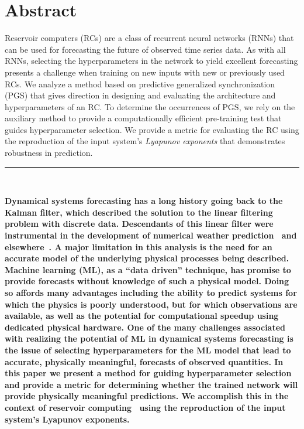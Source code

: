 \documentclass[12pt]{article}
\begin{document}
\section*{Abstract}
Reservoir computers (RCs) are a class of recurrent neural networks (RNNs) that can be used for forecasting the future of observed time series data.  As with all RNNs, selecting the hyperparameters in the network to yield excellent forecasting presents a challenge when training on new inputs with new or previously used RCs. We analyze a method based on predictive generalized synchronization (PGS) that gives direction in designing and evaluating the architecture and hyperparameters of an RC. To determine the occurrences of PGS, we rely on the auxiliary method to provide a computationally efficient pre-training test that guides hyperparameter selection.  We provide a metric for evaluating the RC using the reproduction of the input system's {\it Lyapunov exponents} that demonstrates robustness in prediction.
\begin{center}
\noindent\rule{10cm}{0.4pt}\\
\end{center}
\vspace{0.2in}
{\bf Dynamical systems forecasting has a long history going back to 
the Kalman filter, which described the 
solution to the {\bf linear} filtering problem with discrete data.
Descendants of this linear filter were instrumental in the development of numerical weather prediction~\cite{even09} and
elsewhere~\cite{abar2021}.
A major limitation in this analysis is the need for an accurate 
model of the underlying physical processes being described. Machine learning (ML), as a ``data driven'' technique, has promise to provide forecasts without knowledge of such a physical model.  
Doing so affords many advantages including the ability to predict systems for which the physics is 
poorly understood, but for which observations are available, as well as the potential for computational speedup using dedicated physical hardware.
One of the many challenges associated with realizing the potential of 
ML in dynamical systems forecasting is the issue of selecting hyperparameters for the ML model that lead to accurate, physically meaningful, forecasts of observed quantities. In this paper we present a method for 
guiding hyperparameter selection and provide a metric for determining whether the trained network will provide physically meaningful predictions. We accomplish this in the context of reservoir computing~\cite{luk09,verstraten09,luko11,Jaeger01, Jaeger12, Jaeger04, Schrauwen07, Maass02, Wojcik04,pathak18} using the reproduction of the input system's Lyapunov exponents. }
\end{document}
